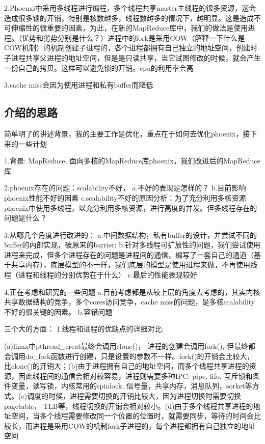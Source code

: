 2.Phoenxi中采用多线程进行编程，多个线程共享master主线程的很多资源，这会造成很多锁的开销，特别是核数越多，线程数越多的情况下，越明显。这是造成不可伸缩性的很重要的因素，为此，在新的MapReduce库中，我们的做法是使用进程。（优势和劣势分别是什么？）进程中的fork是采用COW（解释一下什么是COW机制）的机制创建子进程的，各个进程都拥有自己独立的地址空间，创建时子进程共享父进程的地址空间，但是是只读共享，当它试图修改的时候，就会产生一份自己的拷贝。这样可以避免锁的开销。cpu的利用率会高

3.cache miss会因为使用进程和私有buffer而降低

\subsection{介绍的思路}
简单明了的讲述背景，我的主要工作是优化，重点在于如何去优化phoenix，接下来的一些计划

1.背景: MapReduce, 面向多核的MapReduce库phoenix，我们改进后的MapReduce库

2.phoenix存在的问题：scalability不好，
a.不好的表现是怎样的？
b.目前影响phoenix性能不好的因素
c.scalability不好的原因分析：为了充分利用多核资源phoenix中使用多线程，以充分利用多核资源，进行高度的并发。但多线程存在的问题是什么？


3.从哪几个角度进行改进的：
a.中间数据结构，私有buffer的设计，并尝试不同的buffer的内部实现，破原来的barrier; 
b.针对多线程可扩放性的问题，我们尝试使用进程来完成，但多个进程存在的问题是进程间的通信，编写了一套自己的通道（基于共享内存），底层模型的不一样，我们底层的模型是使用进程来做，不再使用线程（进程和线程的分别优势在于什么）
c.最后的性能表现较好

4.正在考虑和研究的一些问题
a.目前考虑都是从较上层的角度去考虑的，其实内核共享数据结构的竞争，多个cores访问竞争，cache miss的问题，是多核scalability不好的很关键的因素。
b.容错问题

三个大的方面：
1.线程和进程的优缺点的详细对比:

(a)linux中pthread\_creat最终会调用clone()， 进程的创建会调用fork(), 但最终都会调用do\_fork函数进行创建，只是设置的参数不一样。fork()的开销会比较大，比clone()的开销大；(b)由于进程拥有自己的地址空间，而多个线程共享进程的资源，因此线程间的通信会相对较容易，进程则需要多种IPC: pipe, fifo, 互斥锁和条件变量，读写锁，内核常用的spinlock, 信号量，共享内存，消息队列，sorket等方式。(c)调度的时候，进程需要切换的开销比较大，因为进程切换时需要切换pagetable， TLB等，线程切换的开销会相对较小。(d)由于多个线程共享进程的地址空间，当多个线程需要修改同一个位置的位置时，就需要同步，等待的时间会比较长，而进程是采用COW的机制fork子进程的，每个进程都拥有自己独立的地址空间


